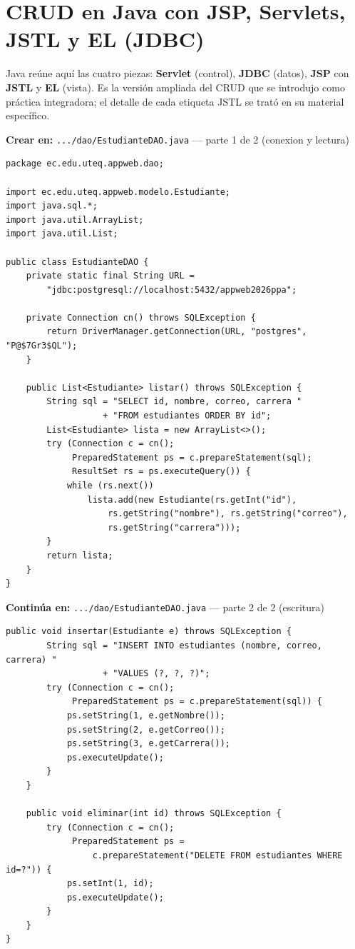 \section{CRUD en Java con JSP, Servlets, JSTL y EL (JDBC)}
\label{sec:cap6:java}

Java reúne aquí las cuatro piezas: \textbf{Servlet} (control),
\textbf{JDBC} (datos), \textbf{JSP} con \textbf{JSTL} y \textbf{EL}
(vista). Es la versión ampliada del CRUD que se introdujo como práctica
integradora; el detalle de cada etiqueta JSTL se trató en su material
específico.

{\small\textbf{Crear en:} \texttt{.../dao/EstudianteDAO.java} --- parte 1 de 2 (conexion y lectura)}
\begin{lstlisting}[style=java,caption={EstudianteDAO.java --- parte 1: conexion y listar},label={lst:c6-java-a}]
package ec.edu.uteq.appweb.dao;

import ec.edu.uteq.appweb.modelo.Estudiante;
import java.sql.*;
import java.util.ArrayList;
import java.util.List;

public class EstudianteDAO {
    private static final String URL =
        "jdbc:postgresql://localhost:5432/appweb2026ppa";

    private Connection cn() throws SQLException {
        return DriverManager.getConnection(URL, "postgres", "P@$7Gr3$QL");
    }

    public List<Estudiante> listar() throws SQLException {
        String sql = "SELECT id, nombre, correo, carrera "
                   + "FROM estudiantes ORDER BY id";
        List<Estudiante> lista = new ArrayList<>();
        try (Connection c = cn();
             PreparedStatement ps = c.prepareStatement(sql);
             ResultSet rs = ps.executeQuery()) {
            while (rs.next())
                lista.add(new Estudiante(rs.getInt("id"),
                    rs.getString("nombre"), rs.getString("correo"),
                    rs.getString("carrera")));
        }
        return lista;
    }
}
\end{lstlisting}

{\small\textbf{Continúa en:} \texttt{.../dao/EstudianteDAO.java} --- parte 2 de 2 (escritura)}
\begin{lstlisting}[style=java,caption={EstudianteDAO.java --- parte 2: insertar, actualizar, eliminar},label={lst:c6-java-b}]
    public void insertar(Estudiante e) throws SQLException {
        String sql = "INSERT INTO estudiantes (nombre, correo, carrera) "
                   + "VALUES (?, ?, ?)";
        try (Connection c = cn();
             PreparedStatement ps = c.prepareStatement(sql)) {
            ps.setString(1, e.getNombre());
            ps.setString(2, e.getCorreo());
            ps.setString(3, e.getCarrera());
            ps.executeUpdate();
        }
    }

    public void eliminar(int id) throws SQLException {
        try (Connection c = cn();
             PreparedStatement ps =
                 c.prepareStatement("DELETE FROM estudiantes WHERE id=?")) {
            ps.setInt(1, id);
            ps.executeUpdate();
        }
    }
}
\end{lstlisting}

